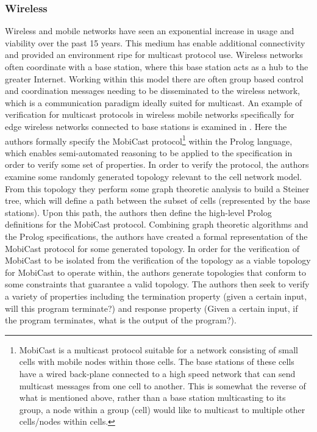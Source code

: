 \documentclass[12pt, fullpage]{article}
\begin{document}
\subsubsection{Wireless}
Wireless and mobile networks have seen an exponential increase in usage and viability over the past 15 years. This medium has enable additional connectivity and provided an environment ripe for multicast protocol use. Wireless networks often coordinate with a base station, where this base station acts as a hub to the greater Internet. Working within this model there are often group based control and coordination messages needing to be disseminated to the wireless network, which is a communication paradigm ideally suited for multicast.
\bigbreak
An example of verification for multicast protocols in wireless mobile networks specifically for edge wireless networks connected to base stations is examined in \cite{Borujerdi2004}. Here the authors formally specify the MobiCast \cite{Tan2000} protocol\footnote{MobiCast is a multicast protocol suitable for a network consisting of small cells with mobile nodes within those cells. The base stations of these cells have a wired back-plane connected to a high speed network that can send multicast messages from one cell to another. This is somewhat the reverse of what is mentioned above, rather than a base station multicasting to its group, a node within a group (cell) would like to multicast to multiple other cells/nodes within cells.} within the Prolog language, which enables semi-automated reasoning to be applied to the specification in order to verify some set of properties.
\bigbreak
In order to verify the protocol, the authors examine some randomly generated topology relevant to the cell network model. From this topology they perform some graph theoretic analysis to build a Steiner tree, which will define a path between the subset of cells (represented by the base stations). Upon this path, the authors then define the high-level Prolog definitions for the MobiCast protocol. 
\bigbreak
Combining graph theoretic algorithms and the Prolog specifications, the authors have created a formal representation of the MobiCast protocol for some generated topology. In order for the verification of MobiCast to be isolated from the verification of the topology as a viable topology for MobiCast to operate within, the authors generate topologies that conform to some constraints that guarantee a valid topology. The authors then seek to verify a variety of properties including the termination property (given a certain input, will this program terminate?) and response property (Given a certain input, if the program terminates, what is the output of the program?).
\end{document}
